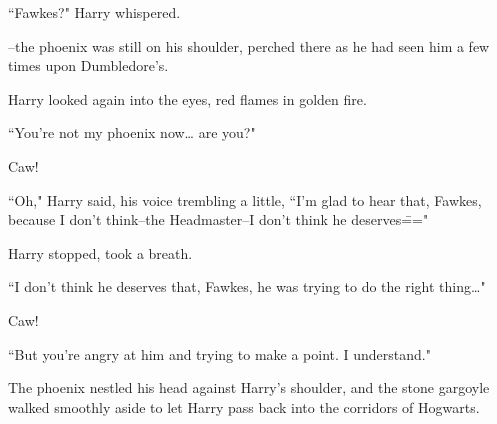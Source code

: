 ``Fawkes?" Harry whispered.

\---the phoenix was still on his shoulder, perched there as he had seen him a few times upon Dumbledore's.

Harry looked again into the eyes, red flames in golden fire.

``You're not my phoenix now{\ldots} are you?"

Caw!

``Oh," Harry said, his voice trembling a little, ``I'm glad to hear that, Fawkes, because I don't think\---the Headmaster\---I don't think he deserves\==="

Harry stopped, took a breath.

``I don't think he deserves that, Fawkes, he was trying to do the right thing{\ldots}"

Caw!

``But you're angry at him and trying to make a point. I understand."

The phoenix nestled his head against Harry's shoulder, and the stone gargoyle walked smoothly aside to let Harry pass back into the corridors of Hogwarts.

